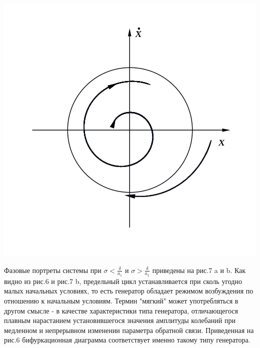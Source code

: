 \begin{center}
\begin{minipage}[t]{0.6\linewidth}
\begin{minipage}{0.45\linewidth}
                \vspace{-30pt}
                \label{fig:7}
            \end{minipage}
            \begin{minipage}{0.45\linewidth}
                \includegraphics[width=\linewidth]{pics/Ris7b.png} 
                \vspace{-30pt}
                \label{fig:8}
            \end{minipage}
    \end{minipage}
\end{center}
  
Фазовые портреты системы при $\sigma<\frac{\delta}{a_1}$ и $\sigma>\frac{\delta}{a_1}$ приведены на рис.7 a и b. Как видно из рис.6 и рис.7 b, 
предельный цикл устанавливается при сколь угодно малых начальных условиях, то есть генератор обладает { режимом} возбуждения по 
отношению к начальным условиям. Термин "мягкий" может употребляться в другом смысле - в качестве характеристики типа генератора, отличающегося 
плавным нарастанием установившегося значения амплитуды колебаний при медленном и непрерывном изменении параметра обратной связи. Приведенная на рис.6 
бифуркационная диаграмма соответствует именно такому типу генератора.  

